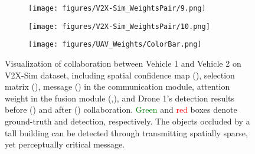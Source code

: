 \documentclass{article}
\begin{document}
\begin{figure}[!t]
\begin{subfigure}{0.18\linewidth}
    \vspace{-5mm}
    \caption{}
    \label{fig:UAV_Message2}
  \end{subfigure}
  \begin{subfigure}{0.18\linewidth}
    \texttt{[image: figures/V2X-Sim\_WeightsPair/9.png]}
    \vspace{-5mm}
    \caption{}
    \label{fig:UAV_AttenWeight2to1}
  \end{subfigure}
\begin{subfigure}{0.18\linewidth}
    \texttt{[image: figures/V2X-Sim\_WeightsPair/10.png]}
    \vspace{-5mm}
    \caption{}
    \label{fig:UAV_DetectionAfterComm}
  \end{subfigure}
  \begin{subfigure}{0.06\linewidth}
    \texttt{[image: figures/UAV\_Weights/ColorBar.png]}
\end{subfigure}
\vspace{-2mm}
  \caption{Visualization of collaboration between Vehicle 1 and Vehicle 2 on V2X-Sim dataset, including spatial confidence map (), selection matrix (), message () in the communication module, attention weight in the fusion module (,), and Drone 1's detection results before () and after () collaboration. \textcolor{green}{Green} and \textcolor{red}{red} boxes denote ground-truth and detection, respectively. The objects occluded by a tall building can be detected through transmitting spatially sparse, yet perceptually critical message. }
  \label{fig:V2X-Sim_Weights}
  \vspace{-4mm}
\end{figure}
\end{document}
